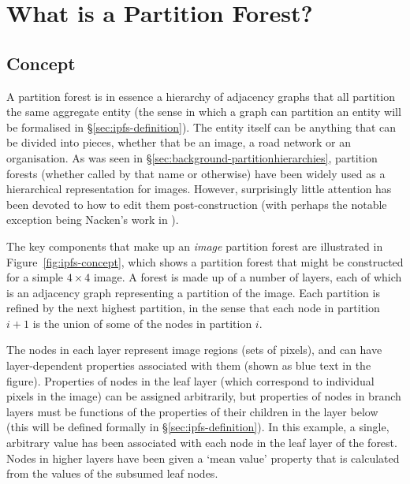 \section{What is a Partition Forest?}

\subsection{Concept}


A partition forest is in essence a hierarchy of adjacency graphs that all partition the same aggregate entity (the sense in which a graph can partition an entity will be formalised in \S\ref{sec:ipfs-definition}). The entity itself can be anything that can be divided into pieces, whether that be an image, a road network or an organisation. As was seen in \S\ref{sec:background-partitionhierarchies}, partition forests (whether called by that name or otherwise) have been widely used as a hierarchical representation for images. However, surprisingly little attention has been devoted to how to edit them post-construction (with perhaps the notable exception being Nacken's work in \cite{nacken95}).

The key components that make up an \emph{image} partition forest are illustrated in Figure~\ref{fig:ipfs-concept}, which shows a partition forest that might be constructed for a simple $4 \times 4$ image.  A forest is made up of a number of layers, each of which is an adjacency graph representing a partition of the image. Each partition is refined by the next highest partition, in the sense that each node in partition $i+1$ is the union of some of the nodes in partition $i$.

The nodes in each layer represent image regions (sets of pixels), and can have layer-dependent properties associated with them (shown as blue text in the figure). Properties of nodes in the leaf layer (which correspond to individual pixels in the image) can be assigned arbitrarily, but properties of nodes in branch layers must be functions of the properties of their children in the layer below (this will be defined formally in \S\ref{sec:ipfs-definition}). In this example, a single, arbitrary value has been associated with each node in the leaf layer of the forest. Nodes in higher layers have been given a `mean value' property that is calculated from the values of the subsumed leaf nodes.


